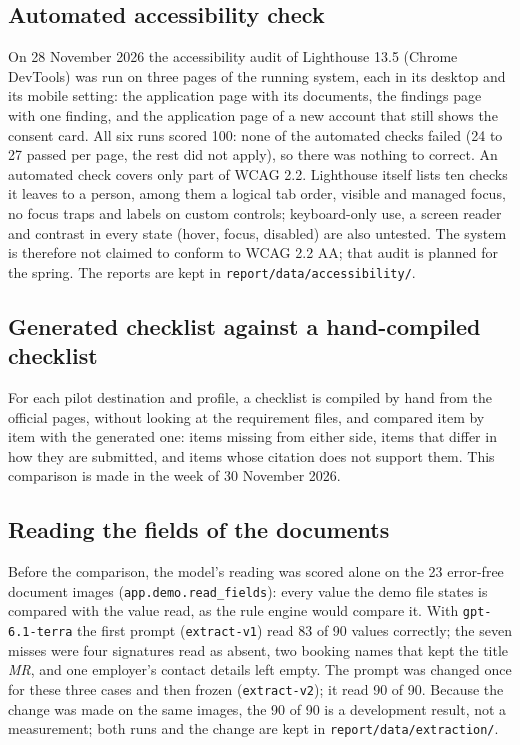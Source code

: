 \subsection{Automated accessibility check}\label{sec:a11y-eval}
On 28 November 2026 the accessibility audit of Lighthouse 13.5 (Chrome DevTools) was run on three
pages of the running system, each in its desktop and its mobile setting: the application page
with its documents, the findings page with one finding, and the application page of a new account
that still shows the consent card. All six runs scored 100: none of the automated checks failed
(24 to 27 passed per page, the rest did not apply), so there was nothing to correct. An automated
check covers only part of WCAG 2.2. Lighthouse itself lists ten checks it leaves to a person,
among them a logical tab order, visible and managed focus, no focus traps and labels on custom
controls; keyboard-only use, a screen reader and contrast in every state (hover, focus,
disabled) are also untested. The system is therefore not claimed to conform to WCAG 2.2 AA; that
audit is planned for the spring. The reports are kept in \texttt{report/data/accessibility/}.

\subsection{Generated checklist against a hand-compiled checklist}\label{sec:checklist-eval}
For each pilot destination and profile, a checklist is compiled by hand from the official pages,
without looking at the requirement files, and compared item by item with the generated one:
items missing from either side, items that differ in how they are submitted, and items whose
citation does not support them. This comparison is made in the week of 30 November 2026.

\subsection{Reading the fields of the documents}\label{sec:extraction-eval}
Before the comparison, the model's reading was scored alone on the 23 error-free document images
(\texttt{app.demo.read\_fields}): every value the demo file states is compared with the value read,
as the rule engine would compare it. With \texttt{gpt-6.1-terra} the first prompt
(\texttt{extract-v1}) read 83 of 90 values correctly; the seven misses were four signatures read as
absent, two booking names that kept the title \emph{MR}, and one employer's contact details left
empty. The prompt was changed once for these three cases and then frozen (\texttt{extract-v2}); it
read 90 of 90. Because the change was made on the same images, the 90 of 90 is a development
result, not a measurement; both runs and the change are kept in \texttt{report/data/extraction/}.


